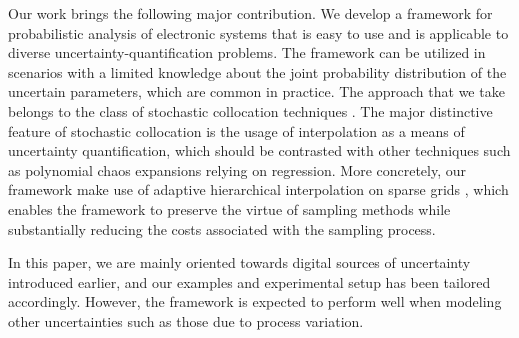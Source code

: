 Our work brings the following major contribution. We develop a framework for
probabilistic analysis of electronic systems that is easy to use and is
applicable to diverse uncertainty-quantification problems. The framework can be
utilized in scenarios with a limited knowledge about the joint probability
distribution of the uncertain parameters, which are common in practice. The
approach that we take belongs to the class of stochastic collocation techniques
\cite{xiu2010}. The major distinctive feature of stochastic collocation is the
usage of interpolation as a means of uncertainty quantification, which should be
contrasted with other techniques such as polynomial chaos expansions relying on
regression. More concretely, our framework make use of adaptive hierarchical
interpolation on sparse grids \cite{klimke2006, ma2009}, which enables the
framework to preserve the virtue of sampling methods while substantially
reducing the costs associated with the sampling process.

In this paper, we are mainly oriented towards digital sources of uncertainty
introduced earlier, and our examples and experimental setup has been tailored
accordingly. However, the framework is expected to perform well when modeling
other uncertainties such as those due to process variation.
